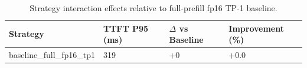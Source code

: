 \begin{table}
\caption{Strategy interaction effects relative to full-prefill fp16 TP-1 baseline.}
\label{tab:interactions}
\begin{tabular}{llll}
\toprule
Strategy & TTFT P95 (ms) & $\Delta$ vs Baseline & Improvement (\%) \\
\midrule
baseline\_full\_fp16\_tp1 & 319 & +0 & +0.0 \\
\bottomrule
\end{tabular}
\end{table}
